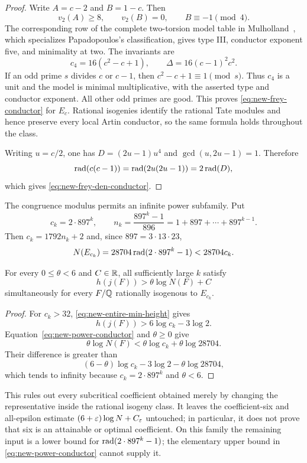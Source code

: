 \begin{proof}
Write $A=c-2$ and $B=1-c$.  Then
\[
 v_2(A)\geq8,\qquad v_2(B)=0,\qquad B\equiv-1\pmod4.
\]
The corresponding row of the complete two-torsion model table in
Mulholland~\cite[Theorem 2.1 and Table 2.1]{Mulholland2006}, which
specializes Papadopoulos's classification, gives type III, conductor
exponent five, and minimality at two.  The invariants are
\[
 c_4=16(c^2-c+1),\qquad \Delta=16(c-1)^2c^2.
\]
If an odd prime $s$ divides $c$ or $c-1$, then $c^2-c+1\equiv1\pmod s$.
Thus $c_4$ is a unit and the model is minimal multiplicative, with the
asserted type and conductor exponent.  All other odd primes are good.  This
proves \eqref{eq:new-frey-conductor} for $E_c$.  Rational isogenies identify
the rational Tate modules and hence preserve every local Artin conductor,
so the same formula holds throughout the class.

Writing $u=c/2$, one has $D=(2u-1)u^4$ and
$\gcd(u,2u-1)=1$.  Therefore
\[
 \operatorname{rad}(c(c-1))=\operatorname{rad}(2u(2u-1))=2\operatorname{rad}(D),
\]
which gives \eqref{eq:new-frey-den-conductor}.
\end{proof}

The congruence modulus permits an infinite power subfamily.  Put
\[
 c_k=2\cdot897^k,\qquad
 n_k=\frac{897^k-1}{896}=1+897+\cdots+897^{k-1}.
\]
Then $c_k=1792n_k+2$ and, since $897=3\cdot13\cdot23$,
\begin{equation}\label{eq:new-power-conductor}
 N(E_{c_k})=28704\operatorname{rad}(2\cdot897^k-1)<28704c_k.
\end{equation}

\begin{theorem}
\label{thm:new-frey-six-obstruction}
For every $0\leq\theta<6$ and $C\in\mathbb R$, all sufficiently large $k$ satisfy
\[
 h(j(F))>\theta\log N(F)+C
\]
simultaneously for every $F/\mathbb Q$ rationally isogenous to $E_{c_k}$.
\end{theorem}

\begin{proof}
For $c_k>32$, \eqref{eq:new-entire-min-height} gives
\[
 h(j(F))>6\log c_k-3\log2.
\]
Equation~\eqref{eq:new-power-conductor} and $\theta\geq0$ give
\[
 \theta\log N(F)<\theta\log c_k+\theta\log28704.
\]
Their difference is greater than
\[
 (6-\theta)\log c_k-3\log2-\theta\log28704,
\]
which tends to infinity because $c_k=2\cdot897^k$ and $\theta<6$.
\end{proof}

This rules out every subcritical coefficient obtained merely by changing
the representative inside the rational isogeny class.  It leaves the
coefficient-six and all-epsilon estimate
$(6+\varepsilon)\log N+C_\varepsilon$ untouched; in particular, it does not prove that
six is an attainable or optimal coefficient.  On this family the
remaining input is a lower bound for
$\operatorname{rad}(2\cdot897^k-1)$; the elementary upper bound in
\eqref{eq:new-power-conductor} cannot supply it.

